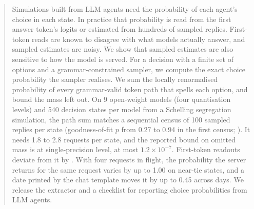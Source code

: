 \begin{abstract}
Simulations built from LLM agents need the probability of each agent's choice in each state.
In practice that probability is read from the first answer token's logits or estimated from hundreds of sampled replies.
First-token reads are known to disagree with what models actually answer, and sampled estimates are noisy.
We show that sampled estimates are also sensitive to how the model is served.
For a decision with a finite set of options and a grammar-constrained sampler, we compute the exact choice probability the sampler realises.
We sum the locally renormalised probability of every grammar-valid token path that spells each option, and bound the mass left out.
On 9 open-weight models (four quantisation levels) and 540 decision states per model from a Schelling segregation simulation, the path sum matches a sequential census of 100 sampled replies per state (goodness-of-fit $p$ from 0.27 to 0.94 in the first census; ).
It needs 1.8 to 2.8 requests per state, and the reported bound on omitted mass is at single-precision level, at most $1.2\times10^{-7}$.
First-token readouts deviate from it by .
With four requests in flight, the probability the server returns for the same request varies by up to 1.00 on near-tie states, and a date printed by the chat template moves it by up to 0.45 across days.
We release the extractor and a checklist for reporting choice probabilities from LLM agents.
\end{abstract}

